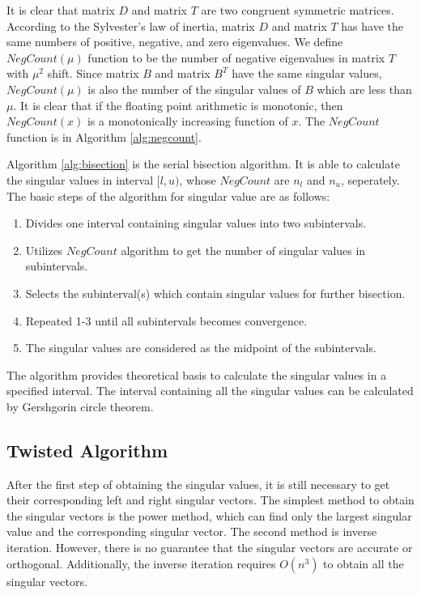 It is clear that matrix $D$ and matrix $T$ are two congruent symmetric matrices.
According to the Sylvester's law of inertia, matrix $D$ and matrix $T$ has have the same numbers of positive, negative, and zero eigenvalues.
We define $NegCount(\mu)$ function to be the number of negative eigenvalues in matrix $T$ with $\mu^2$ shift.
Since matrix $B$ and matrix $B^T$ have the same singular values,
$NegCount(\mu)$ is also the number of the singular values of $B$ which are less than $\mu$.
It is clear that if the floating point arithmetic is monotonic, then $NegCount(x)$ is a monotonically increasing function of $x$\cite{95ETNAbisecion}.
The $NegCount$ function is in Algorithm \ref{alg:negcount}.




Algorithm \ref{alg:bisection} is the serial bisection algorithm.
It is able to calculate the singular values in interval $[l,u)$, whose $NegCount$ are $n_l$ and $n_u$, seperately.
The basic steps of the algorithm for singular value are as follows:
\begin{enumerate}
\item Divides one interval containing singular values into two subintervals.
\item Utilizes $NegCount$ algorithm to get the number of singular values in subintervals.
\item Selects the subinterval(s) which contain singular values for further bisection.
\item Repeated 1-3 until all subintervals becomes convergence.%
\item The singular values are considered as the midpoint of the subintervals.
\end{enumerate}

The algorithm provides theoretical basis to calculate the singular values in a specified interval.
The interval containing all the singular values can be calculated by Gershgorin circle theorem.

\subsection{Twisted Algorithm}
After the first step of obtaining the singular values, it is still necessary to get their corresponding left and right singular vectors.
The simplest method to obtain the singular vectors is the power method, which can find only the largest singular value and the corresponding singular vector\cite{97bookalgebra}.
The second method is inverse iteration.
However, there is no guarantee that the singular vectors are accurate or orthogonal.
Additionally, the inverse iteration requires $O(n^3)$ to obtain all the singular vectors.

